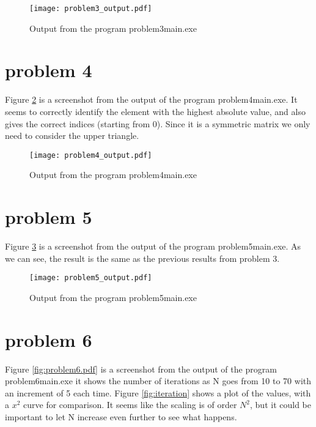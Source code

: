 \documentclass[english,notitlepage]{revtex4-1}
\begin{document}
	\begin{figure}[H]
		\centering 
		\texttt{[image: problem3\_output.pdf]}
		\caption{Output from the program problem3\textunderscore main.exe}
		\label{fig:problem3}
	\end{figure}

	
	\section*{problem 4}
	
	Figure \ref{fig:problem4} is a screenshot from the output of the program problem4\textunderscore main.exe. It seems to correctly identify the element with the highest absolute value, and also gives the correct indices (starting from 0). Since it is a symmetric matrix we only need to consider the upper triangle. 
	
	\begin{figure}[H]
		\centering 
		\texttt{[image: problem4\_output.pdf]}
		\caption{Output from the program problem4\textunderscore main.exe}
		\label{fig:problem4}
	\end{figure}
	
	

	\section*{problem 5}
	
	Figure \ref{fig:problem5} is a screenshot from the output of the program problem5\textunderscore main.exe. As we can see, the result is the same as the previous results from problem 3. 
	
	\begin{figure}[H]
		\centering 
		\texttt{[image: problem5\_output.pdf]}
		\caption{Output from the program problem5\textunderscore main.exe}
		\label{fig:problem5}
	\end{figure}

	\section*{problem 6}

	Figure \ref{fig:problem6.pdf} is a screenshot from the output of the program problem6\textunderscore main.exe it shows the number of iterations as N goes from 10 to 70 with an increment of 5 each time. Figure \ref{fig:iteration} shows a plot of the values, with a $x^2$ curve for comparison. It seems like the scaling is of order $N^2$, but it could be important to let N increase even further to see what happens. 
	
\end{document}
